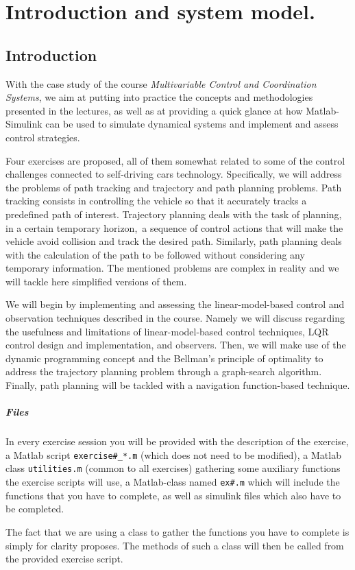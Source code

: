 \setcounter{chapter}{-1}
\chapter{Introduction and system model.}
%
\section{Introduction}
	With the case study of the course \emph{Multivariable Control and Coordination Systems}, we aim at putting into practice the concepts and methodologies presented in the lectures, as well as at providing a quick glance at how Matlab-Simulink can be used to simulate dynamical systems and implement and assess control strategies. \par
	Four exercises are proposed, all of them somewhat related to some of the control challenges connected to self-driving cars technology.
	Specifically, we will address the problems of path tracking and trajectory and path planning problems. 
	Path tracking consists in controlling the vehicle so that it accurately tracks a predefined path of interest. 
	Trajectory planning deals with the task of planning, in a certain temporary horizon, a sequence of control actions that will make the vehicle avoid collision and track the desired path. 
	Similarly, path planning deals with the calculation of the path to be followed without considering any temporary information.
	The mentioned problems are complex in reality and we will tackle here simplified versions of them. \par
	We will begin by implementing and assessing the linear-model-based control and observation techniques described in the course.
	Namely we will discuss regarding the usefulness and limitations of linear-model-based control techniques, LQR control design and implementation, and observers.
	Then, we will make use of the dynamic programming concept and the Bellman's principle of optimality to address the trajectory planning problem through a graph-search algorithm.
	Finally, path planning will be tackled with a navigation function-based technique.
	\paragraph{Files}
	In every exercise session you will be provided with the description of the exercise, a Matlab script \texttt{exercise\#\_*.m} (which does not need to be modified), a Matlab class \texttt{utilities.m} (common to all exercises) gathering some auxiliary functions the exercise scripts will use, a Matlab-class named \texttt{ex\#.m} which will include the functions that you have to complete, as well as simulink files which also have to be completed.\par
	The fact that we are using a class to gather the functions you have to complete is simply for clarity proposes. 
	The methods of such a class will then be called from the provided exercise script.\par
